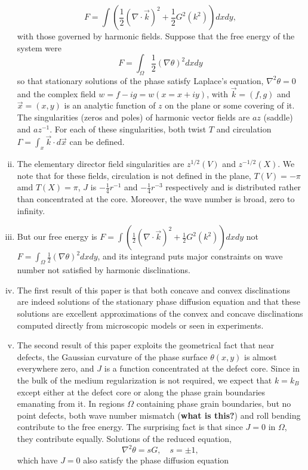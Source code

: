 \documentclass[12pt]{article}
\newcounter{solution}
\begin{document}
\begin{enumerate}[(i)]
    \[
    F = \int \left( \frac{1}{2}(\nabla \cdot \vec{k})^2 + \frac{1}{2}G^2(k^2) \right)dxdy,
    \] 
    with those governed by harmonic fields.
Suppose that the free energy of the system were
\[
    F = \int_{\Omega}\frac{1}{2}(\nabla\theta)^2dxdy
\] 
so that stationary solutions of the phase satisfy Laplace's equation, $\nabla^2\theta = 0$ and the complex field $w=f-ig=w(x=x+iy)$, with $\vec{k}=(f,g)$ and $\vec{x}=(x,y)$ is an analytic function of $z$ on the plane or some covering of it. The singularities (zeros and poles) of harmonic vector fields are $az$ (saddle) and $az^{-1}$. For each of these singularities, both twist $T$ and circulation $\Gamma=\int_x\vec{k}\cdot d\vec{x}$ can be defined. 
\item The elementary director field singularities are $z^{1/2}(V)$ and $z^{-1/2}(X)$. We note that for these fields, circulation is not defined in the plane, $T(V)=-\pi$ amd $T(X)=\pi$, $J$ is $-\frac{1}{4}r^{-1}$ and $-\frac{1}{4}r^{-3}$ respectively and is distributed rather than concentrated at the core. Moreover, the wave number is broad, zero to infinity.
\item But our free energy is $F = \int \left( \frac{1}{2}(\nabla \cdot \vec{k})^2 + \frac{1}{2}G^2(k^2) \right)dxdy$ not $F = \int_{\Omega}\frac{1}{2}(\nabla\theta)^2dxdy$, and its integrand puts major constraints on wave number not satisfied by harmonic disclinations. 
\item The first result of this paper is that both concave and convex disclinations are indeed solutions of the stationary phase diffusion equation and that these solutions are excellent approximations of the convex and concave disclinations computed directly from microscopic models or seen in experiments. 
\item The second result of this paper exploits the geometrical fact that near defects, the Gaussian curvature of the phase surface $\theta(x,y)$ is almost everywhere zero, and $J$ is a function concentrated at the defect core. Since in the bulk of the medium regularization is not required, we expect that $k=k_B$ except either at the defect core or along the phase grain boundaries emanating from it. In regions $\Omega$ containing phase grain boundaries, but no point defects, both wave number mismatch (\textbf{what is this?}) and roll bending contribute to the free energy. The surprising fact is that since $J=0$ in $\Omega$, they contribute equally. Solutions of the reduced equation,
    \[
    \nabla^2\theta = sG, \quad s=\pm 1,
    \] 
    which have $J=0$ also satisfy the phase diffusion equation

\end{enumerate}
\end{document}
